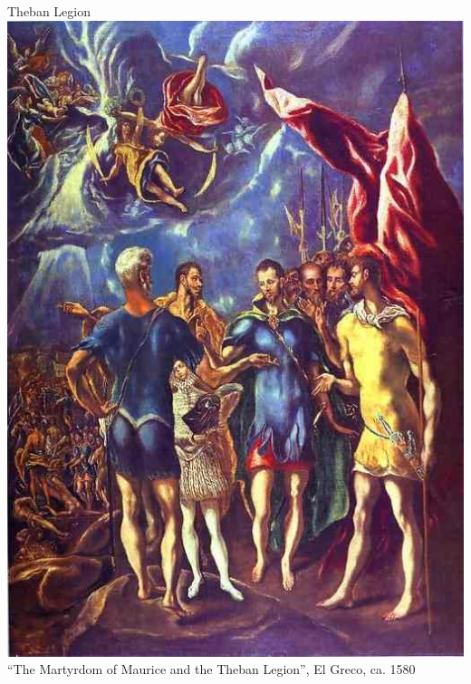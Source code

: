 \begin{frame}{Theban Legion}
    \centering
    \includegraphics[height=0.8\textheight]{img/theban-2.jpg} \\
    ``The Martyrdom of Maurice and the Theban Legion'', El Greco, ca. 1580  \\
\end{frame}

